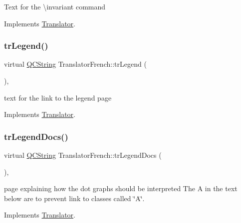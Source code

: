 Text for the \textbackslash{}invariant command 

Implements \mbox{\hyperlink{class_translator}{Translator}}.

\mbox{\label{class_translator_french_ac8e478c6e77ce2d5dd18ff7a605a060b}} 
\subsubsection{\texorpdfstring{trLegend()}{trLegend()}}
{\footnotesize\ttfamily virtual \mbox{\hyperlink{class_q_c_string}{Q\+C\+String}} Translator\+French\+::tr\+Legend (\begin{DoxyParamCaption}{ }\end{DoxyParamCaption})\hspace{0.3cm}{\ttfamily [inline]}, {\ttfamily [virtual]}}

text for the link to the legend page 

Implements \mbox{\hyperlink{class_translator}{Translator}}.

\mbox{\label{class_translator_french_ab32a73bfc3b023f6c8db176c4d0e233b}} 
\subsubsection{\texorpdfstring{trLegendDocs()}{trLegendDocs()}}
{\footnotesize\ttfamily virtual \mbox{\hyperlink{class_q_c_string}{Q\+C\+String}} Translator\+French\+::tr\+Legend\+Docs (\begin{DoxyParamCaption}{ }\end{DoxyParamCaption})\hspace{0.3cm}{\ttfamily [inline]}, {\ttfamily [virtual]}}

page explaining how the dot graph\textquotesingle{}s should be interpreted The A in the text below are to prevent link to classes called \char`\"{}\+A\char`\"{}. 

Implements \mbox{\hyperlink{class_translator}{Translator}}.

\mbox{\label{class_translator_french_a3038b65c7aa02877f4ebaa3b64b20262}} 
